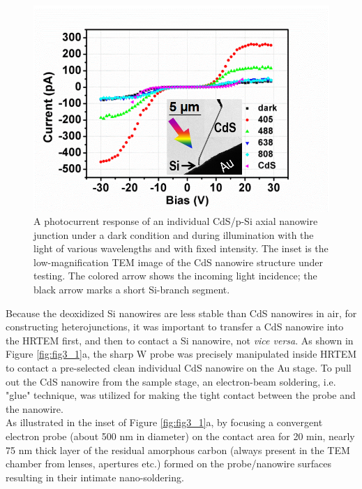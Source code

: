 \begin{figure}  
\includegraphics[width=\textwidth]{figures/figure3_3}
\caption[Photocurrent through junction.]{A photocurrent response of an individual CdS/p-Si axial nanowire junction under a dark condition and during illumination with the light of various wavelengths and with fixed intensity. The inset is the low-magnification TEM image of the CdS nanowire structure under testing. The colored arrow shows the incoming light incidence; the black arrow marks a short Si-branch segment.
\label{fig:fig3_3}}
\end{figure}

Because the deoxidized Si nanowires are less stable than CdS nanowires in air, for constructing heterojunctions, it was important to transfer a CdS nanowire into the HRTEM first, and then to contact a Si nanowire, not \textit{vice versa}. As shown in Figure \ref{fig:fig3_1}a, the sharp W probe was precisely manipulated inside HRTEM to contact a pre-selected clean individual CdS nanowire on the Au stage. To pull out the CdS nanowire from the sample stage, an electron-beam soldering, i.e. "glue" technique, was utilized for making the tight contact between the probe and the nanowire. \\

As illustrated in the inset of Figure \ref{fig:fig3_1}a, by focusing a convergent electron probe (about 500 nm in diameter) on the contact area for 20 min, nearly 75 nm thick layer of the residual amorphous carbon (always present in the TEM chamber from lenses, apertures etc.) formed on the probe/nanowire surfaces  resulting in their intimate nano-soldering. \\

